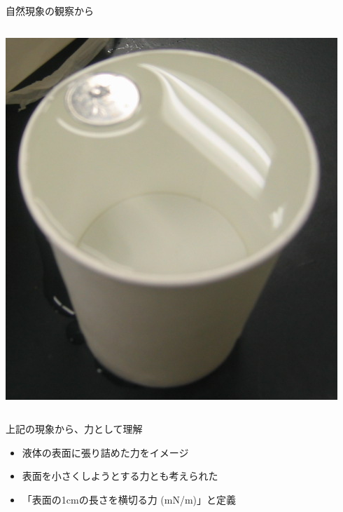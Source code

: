 \documentclass[unicode,12pt]{beamer}%
\begin{document}
\begin{frame}
\begin{block}{自然現象の観察から}
\begin{columns}[c, onlytextwidth]
			\centering
			\includegraphics[width=.41\textwidth]{hyoumen_1.png}
		\end{columns}
	\end{block}

	\begin{exampleblock}{上記の現象から、力として理解}
		\begin{itemize}
			\item 液体の表面に張り詰めた力をイメージ
			\item 表面を小さくしようとする力とも考えられた
			\item 「表面の1cmの長さを横切る力 (mN/m)」と定義
		\end{itemize}
	\end{exampleblock}
\end{frame}
\end{document}
